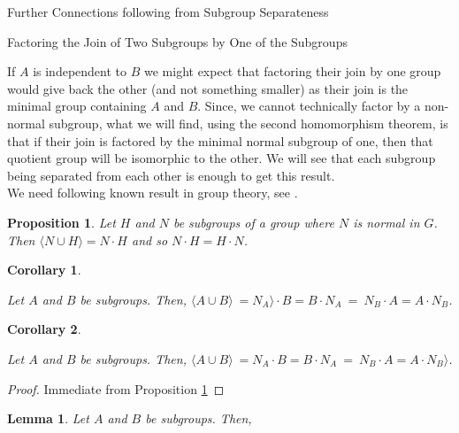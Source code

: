 \documentclass{article}
\newtheorem{proposition}{Proposition}[section]
\newtheorem{corollary}{Corollary}[section]
\newtheorem{lemma}{Lemma}[section]
\begin{document}
	\begin{section}{Further Connections following from Subgroup Separateness}
		
		\begin{subsection}{Factoring the Join of Two Subgroups by One of the Subgroups}
			
			If $A$ is independent to $B$ we might expect that factoring their join by one group would give back  the other (and not something smaller)  as their join is the minimal group containing $A$ and $B$. Since, we cannot technically factor by a non-normal subgroup, what we will find, using the second homomorphism theorem, is that if their join is factored by the minimal normal subgroup of one, then that quotient group will be isomorphic to the other.  We will see that each subgroup being separated from each other is enough to get this result.\\
			
			\noindent We need following  known result in group theory, see \cite{B2}.
			
			\begin{proposition}\label{P2.5}
				Let $H$ and $N$ be subgroups of a group where $N$ is normal in $G$. Then $\langle  N \cup H\rangle  = N \cdot H$ and so $N \cdot H= H\cdot N$.
				
				
			\end{proposition}	
			
			\begin{corollary}\label{C2.5}
				
				Let $A$ and $B$ be subgroups. Then, $\langle  A \cup B\rangle  \ = N_A\rangle  \cdot B =  B \cdot N_A \ = \  N_B \cdot A = A \cdot  N_B $.
				
			\end{corollary}
			
			\begin{corollary}\label{C2.5}
				
				Let $A$ and $B$ be subgroups. Then, $\langle  A \cup B\rangle  \ = N_A  \cdot B =  B \cdot N_A \ = \ N_B  \cdot A = A \cdot N_B\rangle $.
				
			\end{corollary}
			
			\begin{proof}
				Immediate from Proposition \ref{P2.5}
			\end{proof}
			
			
			
			
			
			\begin{lemma}\label{FactoringL}
				Let $A$ and $B$ be subgroups. Then, \\
				

\end{lemma}
\end{subsection}
\end{section}
\end{document}
